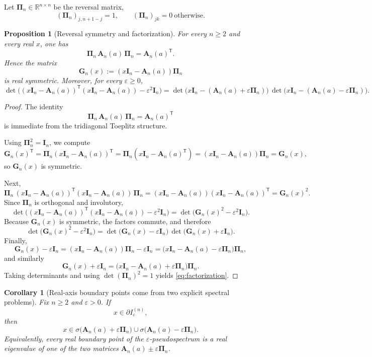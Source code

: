 \documentclass[11pt]{article}
\numberwithin{equation}{section}
\newtheorem{proposition}[theorem]{Proposition}
\newtheorem{corollary}[theorem]{Corollary}
\newcommand{\R}{\mathbb R}
\newcommand{\A}{\mathbf A}
\newcommand{\I}{\mathbf I}
\newcommand{\PiM}{\mathbf \Pi}
\begin{document}
Let \(\PiM_n\in\R^{n\times n}\) be the reversal matrix,
\[
(\PiM_n)_{j,n+1-j}=1,\qquad (\PiM_n)_{jk}=0\ \text{otherwise}.
\]

\begin{proposition}[Reversal symmetry and factorization]\label{prop:factorization}
For every \(n\ge2\) and every real \(x\), one has
\[
\PiM_n\,\A_n(a)\,\PiM_n=\A_n(a)^{\mathsf T}.
\]
Hence the matrix
\[
\mathbf G_n(x):=(x\I_n-\A_n(a))\PiM_n
\]
is real symmetric. Moreover, for every \(\varepsilon\ge0\),
\begin{equation}\label{eq:factorization}
\det\!\bigl((x\I_n-\A_n(a))^{\mathsf T}(x\I_n-\A_n(a))-\varepsilon^2\I_n\bigr)
=
\det\!\bigl(x\I_n-(\A_n(a)+\varepsilon\PiM_n)\bigr)\,
\det\!\bigl(x\I_n-(\A_n(a)-\varepsilon\PiM_n)\bigr).
\end{equation}
\end{proposition}

\begin{proof}
The identity
\[
\PiM_n\,\A_n(a)\,\PiM_n=\A_n(a)^{\mathsf T}
\]
is immediate from the tridiagonal Toeplitz structure.

Using \(\PiM_n^2=\I_n\), we compute
\[
\mathbf G_n(x)^{\mathsf T}
=
\PiM_n(x\I_n-\A_n(a))^{\mathsf T}
=
\PiM_n(x\I_n-\A_n(a)^{\mathsf T})
=
(x\I_n-\A_n(a))\PiM_n
=
\mathbf G_n(x),
\]
so \(\mathbf G_n(x)\) is symmetric.

Next,
\[
\PiM_n\,(x\I_n-\A_n(a))^{\mathsf T}(x\I_n-\A_n(a))\,\PiM_n
=
(x\I_n-\A_n(a))(x\I_n-\A_n(a))^{\mathsf T}
=
\mathbf G_n(x)^2.
\]
Since \(\PiM_n\) is orthogonal and involutory,
\[
\det\!\bigl((x\I_n-\A_n(a))^{\mathsf T}(x\I_n-\A_n(a))-\varepsilon^2\I_n\bigr)
=
\det\!\bigl(\mathbf G_n(x)^2-\varepsilon^2\I_n\bigr).
\]
Because \(\mathbf G_n(x)\) is symmetric, the factors commute, and therefore
\[
\det\!\bigl(\mathbf G_n(x)^2-\varepsilon^2\I_n\bigr)
=
\det\!\bigl(\mathbf G_n(x)-\varepsilon\I_n\bigr)\,
\det\!\bigl(\mathbf G_n(x)+\varepsilon\I_n\bigr).
\]
Finally,
\[
\mathbf G_n(x)-\varepsilon\I_n
=
(x\I_n-\A_n(a))\PiM_n-\varepsilon\I_n
=
\bigl(x\I_n-\A_n(a)-\varepsilon\PiM_n\bigr)\PiM_n,
\]
and similarly
\[
\mathbf G_n(x)+\varepsilon\I_n
=
\bigl(x\I_n-\A_n(a)+\varepsilon\PiM_n\bigr)\PiM_n.
\]
Taking determinants and using \(\det(\PiM_n)^2=1\) yields
\eqref{eq:factorization}.
\end{proof}

\begin{corollary}[Real-axis boundary points come from two explicit spectral problems]
\label{cor:boundary}
Fix \(n\ge2\) and \(\varepsilon>0\).  If
\[
x\in\partial I_\varepsilon^{(n)},
\]
then
\[
x\in \sigma\!\bigl(\A_n(a)+\varepsilon\PiM_n\bigr)
\cup
\sigma\!\bigl(\A_n(a)-\varepsilon\PiM_n\bigr).
\]
Equivalently, every real boundary point of the \(\varepsilon\)-pseudospectrum is a real
eigenvalue of one of the two matrices \(\A_n(a)\pm \varepsilon\PiM_n\).
\end{corollary}
\end{document}
